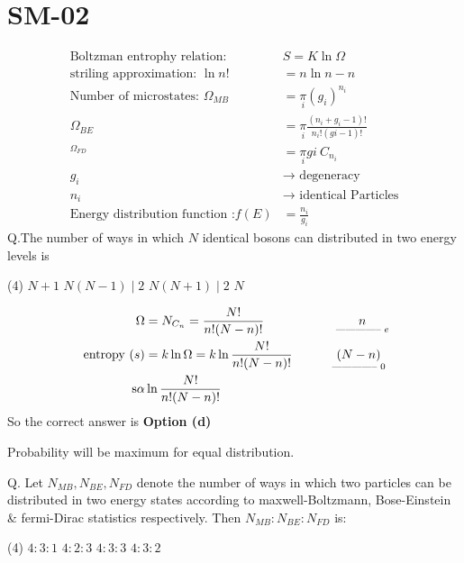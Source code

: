 \chapter{SM-02}
\begin{align*}
\text{Boltzman entrophy relation: }&S=K \ln \Omega\\
\text{striling approximation: }\ln n !&=n \ln n-n\\
\text{Number of microstates: }
\Omega_{M B}&=\underset{i}{\pi}\left(g_{i}\right)^{n_{i}}\\
\Omega_{B E}&=\underset{i}{\pi}\frac{\left(n_{i}+g_{i}-1\right) !}{n_{i} !(g i-1) !}\\
{ }^{\Omega_{F D}}&=\underset{i}{\pi}{g i }\  C_{n_{i}}\\
g_{i} &\rightarrow\text{ degeneracy}\\
n_{i} &\rightarrow\text{ identical Particles}\\
\text{Energy distribution function :}f(E)&=\frac{n_{i}}{g_{i}}
\end{align*}
Q.The number of ways in which $N$ identical bosons can distributed in two energy levels is 
 \begin{tasks}(4)
	\task[\textbf{a.}] $N+1$
	\task[\textbf{b.}]$N(N-1) \mid 2$
	\task[\textbf{c.}]$N(N+1) \mid 2$
	\task[\textbf{d.}]$N$ 
\end{tasks}
\begin{answer}
	\begin{align*}
	\Omega&=N_ {C_n}=\frac{N !}{n !(N-n) !}\hspace{2cm}\underset{\text{-------------- }e}{n}\\
	\text { entropy }(s)&=k \ln \Omega=k \ln \frac{N !}{n !(N-n) !}\hspace{1.1cm}\underset{\text{-------------- } 0}{(N-n)}\\
	\operatorname{s\alpha } &\ln \frac{N !}{n !(N-n) !}
	\end{align*}
		So the correct answer is \textbf{Option (d)}
\end{answer}
\begin{note}
	Probability will be maximum for equal distribution.
\end{note}
Q. Let $N_{M B}, N_{B E}, N_{F D}$ denote the number of ways in which two particles can be distributed in two energy states according to maxwell-Boltzmann, Bose-Einstein \& fermi-Dirac statistics respectively. Then $N_{M B}: N_{B E}: N_{F D}$ is:
 \begin{tasks}(4)
	\task[\textbf{a.}]$4: 3: 1$
	\task[\textbf{b.}] $4: 2: 3$
	\task[\textbf{c.}]$4: 3: 3$
	\task[\textbf{d.}] $4: 3: 2$
\end{tasks}
